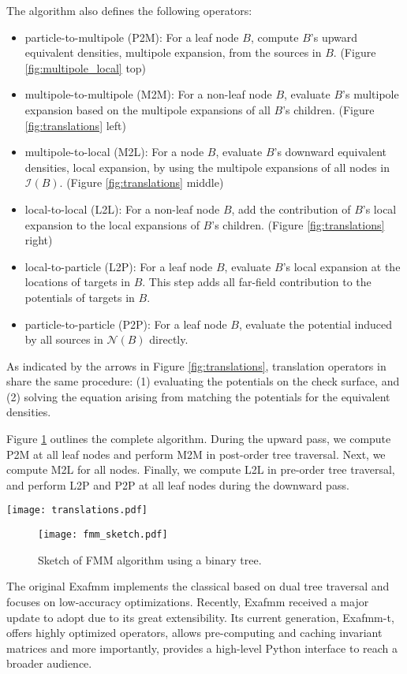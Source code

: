 The algorithm also defines the following operators:
%
\begin{itemize}
    \item particle-to-multipole (P2M): For a leaf node $B$, compute $B$'s upward equivalent densities, \ie multipole expansion, from the sources in $B$. (Figure \ref{fig:multipole_local} top)
    \item multipole-to-multipole (M2M): For a non-leaf node $B$, evaluate $B$'s multipole expansion based on the multipole expansions of all $B$'s children. (Figure \ref{fig:translations} left)
    \item multipole-to-local (M2L): For a node $B$, evaluate $B$'s downward equivalent densities, \ie local expansion, by using the multipole expansions of all nodes in $\mathcal{I}(B)$. (Figure \ref{fig:translations} middle)
    \item local-to-local (L2L): For a non-leaf node $B$, add the contribution of $B$'s local expansion to the local expansions of $B$'s children. (Figure \ref{fig:translations} right)
    \item local-to-particle (L2P): For a leaf node $B$, evaluate $B$'s local expansion at the locations of targets in $B$.
    This step adds all far-field contribution to the potentials of targets in $B$. 
    \item particle-to-particle (P2P): For a leaf node $B$, evaluate the potential induced by all sources in $\mathcal{N}(B)$ directly.
\end{itemize}
%
As indicated by the arrows in Figure \ref{fig:translations}, translation operators in \kifmm share the same procedure: (1) evaluating the potentials on the check surface, and (2) solving the equation arising from matching the potentials for the equivalent densities.

Figure \ref{fig:fmm_sketch} outlines the complete \fmm algorithm.
During the upward pass, we compute P2M at all leaf nodes and perform M2M in post-order tree traversal.
Next, we compute M2L for all nodes.
Finally, we compute L2L in pre-order tree traversal, and perform L2P and P2P at all leaf nodes during the downward pass.

\begin{figure*}
    \centering
    \texttt{[image: translations.pdf]}
    \caption{M2M (left), M2L (middle) and L2L (right) operators in \kifmm. Node $C$ is the parent of $B$, and node $A$ is in the interaction list of $B$.}
    \label{fig:translations}
\end{figure*}

\begin{figure}
    \centering
    \texttt{[image: fmm\_sketch.pdf]}
    \caption{Sketch of FMM algorithm using a binary tree.}
    \label{fig:fmm_sketch}
\end{figure}

The original Exafmm \cite{yokota2012tuned,yokota2013fmm} implements the classical \fmm based on dual tree traversal and focuses on low-accuracy optimizations.
Recently, Exafmm received a major update to adopt \kifmm due to its great extensibility.
Its current generation, Exafmm-t, offers highly optimized \kifmm operators, allows pre-computing and caching invariant matrices and more importantly, provides a high-level Python interface to reach a broader audience.